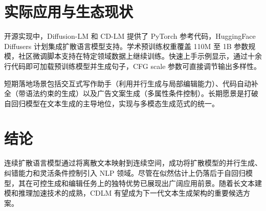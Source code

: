 \chapter{实际应用与生态现状}
开源实现中，Diffusion-LM 和 CD-LM 提供了 PyTorch 参考代码，HuggingFace Diffusers 计划集成扩散语言模型支持。学术预训练权重覆盖 110M 至 1B 参数规模，社区微调脚本支持在特定领域数据上继续训练。快速上手示例显示，通过十余行代码即可加载预训练模型并生成句子，CFG scale 参数可直接调节输出多样性。\par
短期落地场景包括交互式写作助手（利用并行生成与局部编辑能力）、代码自动补全（带语法约束的生成）以及广告文案生成（多属性条件控制）。长期愿景是打破自回归模型在文本生成的主导地位，实现与多模态生成范式的统一。\par
\chapter{结论}
连续扩散语言模型通过将离散文本映射到连续空间，成功将扩散模型的并行生成、纠错能力和灵活条件控制引入 NLP 领域。尽管在似然估计上仍落后于自回归模型，其在可控生成和编辑任务上的独特优势已展现出广阔应用前景。随着长文本建模和推理加速技术的成熟，CDLM 有望成为下一代文本生成架构的重要候选方案。\par
